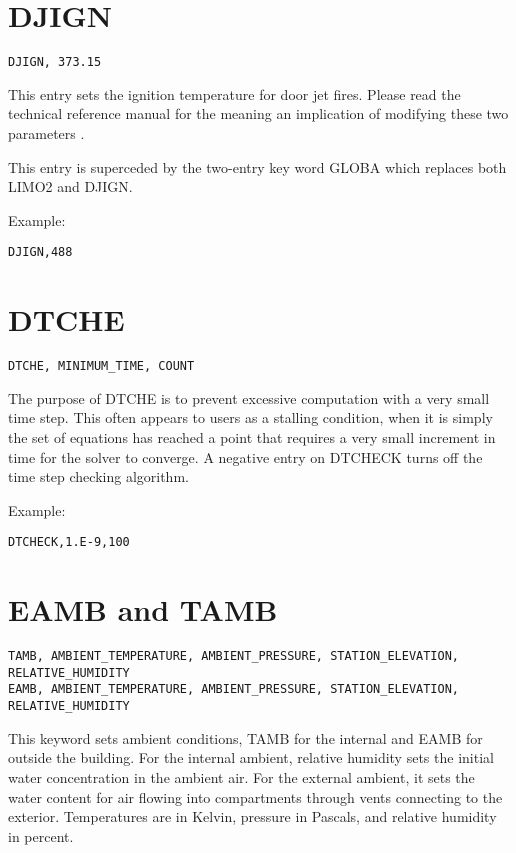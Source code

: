 \section{DJIGN}

\begin{lstlisting}
DJIGN, 373.15
\end{lstlisting}

This entry sets the ignition temperature for door jet fires. Please read the technical reference manual for the meaning an implication of modifying these two parameters \cite{CFAST_Tech_Guide_6}.

This entry is superceded by the two-entry key word GLOBA which replaces both LIMO2 and DJIGN.

Example:

\begin{lstlisting}
DJIGN,488
\end{lstlisting}

\section{DTCHE}

\begin{lstlisting}
DTCHE, MINIMUM_TIME, COUNT
\end{lstlisting}

The purpose of DTCHE is to prevent excessive computation with a very small time step. This often appears to users as a stalling condition, when it is simply the set of equations has reached a point that requires a very small increment in time for the solver to converge. A negative entry on DTCHECK turns off the time step checking algorithm.

Example:

\begin{lstlisting}
DTCHECK,1.E-9,100
\end{lstlisting}

\section{EAMB and TAMB}

\begin{lstlisting}
TAMB, AMBIENT_TEMPERATURE, AMBIENT_PRESSURE, STATION_ELEVATION, RELATIVE_HUMIDITY
EAMB, AMBIENT_TEMPERATURE, AMBIENT_PRESSURE, STATION_ELEVATION, RELATIVE_HUMIDITY
\end{lstlisting}

This keyword sets ambient conditions, TAMB for the internal and EAMB for outside the building. For the internal ambient, relative humidity sets the initial water concentration in the ambient air.  For the external ambient, it sets the water content for air flowing into compartments through vents connecting to the exterior. Temperatures are in Kelvin, pressure in Pascals, and relative humidity in percent.

